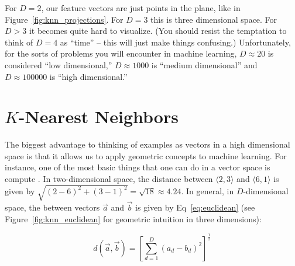 For $D=2$, our feature vectors are just points in the plane, like in
Figure~\ref{fig:knn_projections}.  For $D=3$ this is three dimensional
space.  For $D>3$ it becomes quite hard to visualize.  (You should
resist the temptation to think of $D=4$ as ``time'' -- this will just
make things confusing.)  Unfortunately, for the sorts of problems you
will encounter in machine learning, $D \approx 20$ is considered ``low
dimensional,'' $D \approx 1000$ is ``medium dimensional'' and $D
\approx 100000$ is ``high dimensional.''


\section[K-Nearest Neighbors]{$K$-Nearest Neighbors}

The biggest advantage to thinking of examples as vectors in a high
dimensional space is that it allows us to apply geometric concepts to
machine learning.  For instance, one of the most basic things that one
can do in a vector space is compute .  In
two-dimensional space, the distance between $\langle 2,3\rangle$ and
$\langle 6,1\rangle$ is given by $\sqrt{(2-6)^2 + (3-1)^2} = \sqrt{18}
\approx 4.24$.  In general, in $D$-dimensional space, the
 between vectors $\vec a$ and $\vec b$ is
given by Eq~\eqref{eq:euclidean} (see Figure~\ref{fig:knn_euclidean}
for geometric intuition in three dimensions):


\begin{equation} \label{eq:euclidean}
d(\vec a, \vec b) = \left[ \sum_{d=1}^D (a_d - b_d)^2 \right]^{\frac 1 2}
\end{equation}




